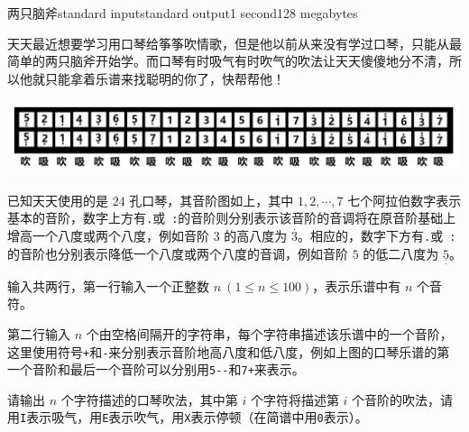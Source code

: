 \begin{problem}{两只脑斧}{standard input}{standard output}{1 second}{128 megabytes}

    天天最近想要学习用口琴给筝筝吹情歌，但是他以前从来没有学过口琴，只能从最简单的两只脑斧开始学。而口琴有时吸气有时吹气的吹法让天天傻傻地分不清，所以他就只能拿着乐谱来找聪明的你了，快帮帮他！

    \begin{center}
        \includegraphics[width=17cm]{Official/1.png}
    \end{center}

    已知天天使用的是 $24$ 孔口琴，其音阶图如上，其中 $1,2,\cdots,7$ 七个阿拉伯数字表示基本的音阶，数字上方有\texttt{.}或\ \texttt{:}的音阶则分别表示该音阶的音调将在原音阶基础上增高一个八度或两个八度，例如音阶 $3$ 的高八度为 $\overset{.}{3}$。相应的，数字下方有\texttt{.}或\ \texttt{:}的音阶也分别表示降低一个八度或两个八度的音调，例如音阶 $5$ 的低二八度为 $\underset{:}{5}$。

    \InputFile

    输入共两行，第一行输入一个正整数 $n\ (1\le n\le 100)$，表示乐谱中有 $n$ 个音符。

    第二行输入 $n$ 个由空格间隔开的字符串，每个字符串描述该乐谱中的一个音阶，这里使用符号\texttt{+}和\texttt{-}来分别表示音阶地高八度和低八度，例如上图的口琴乐谱的第一个音阶和最后一个音阶可以分别用\texttt{5-}\texttt{-}和\texttt{7+}来表示。
    
    \OutputFile
    
    请输出 $n$ 个字符描述的口琴吹法，其中第 $i$ 个字符将描述第 $i$ 个音阶的吹法，请用\texttt{I}表示吸气，用\texttt{E}表示吹气，用\texttt{X}表示停顿（在简谱中用\texttt{0}表示）。
    
    \Example
    
    \begin{example}
    \end{example}

\end{problem}